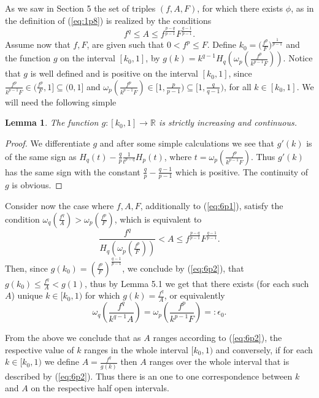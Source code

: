 \documentclass{article}
\numberwithin{equation}{section}
\newtheorem{lemma}{Lemma}[section]
\theoremstyle{definition}
\theoremstyle{remark}
\begin{document}
As we saw in Section 5 the set of triples $(f,A,F)$, for which there exists $\phi$, as in the definition of (\ref{eq:1p8}) is realized by the conditions
\begin{equation}\label{eq:6p1}
f^q\leq A \leq f^{\frac{p-q}{p-1}} F^{\frac{q-1}{p-1}}. 
\end{equation}
Assume now that $f,F$, are given such that $0<f^p\leq F$. Define 
$k_0=\big(\frac{f^p}{F}\big)^{\frac{1}{p-1}}$ and the function $g$ on the interval $[k_0,1]$, by $g(k)=k^{q-1} H_q(\omega_p(\frac{f^p}{k^{p-1}F}))$.
Notice that $g$ is well defined and is positive on the interval $[k_0,1]$, since $\frac{f^p}{k^{p-1}F} \in (\frac{f^p}{F},1] \subseteq (0,1] $
and $\omega_p(\frac{f^p}{k^{p-1}F}) \in [1,\frac{p}{p-1}) \subseteq [1,\frac{q}{q-1})$, for all $k\in [k_0,1]$. We will need the following simple

\begin{lemma} \label{lem:6p1}
The function $g:[k_0,1] \rightarrow \mathbb{R}$ is strictly increasing and continuous.
\end{lemma}

\begin{proof}
We differentiate $g$ and after some simple calculations we see that $g'(k)$ is of the same sign as $H_q(t)-\frac{q}{p}\frac{1}{t^{p-q}}H_p(t)$, where $t=\omega_p(\frac{f^p}{k^{p-1}F})$. Thus $g'(k)$ has the same sign with the constant $\frac{q}{p}-\frac{q-1}{p-1}$ which is positive. The continuity of $g$ is obvious.
\end{proof}
Consider now the case where $f,A,F$, additionally to (\ref{eq:6p1}), satisfy the condition 
$\omega_q(\frac{f^q}{A})> \omega_p(\frac{f^p}{F})$, which is equivalent to
\begin{equation}\label{eq:6p2}
\frac{f^q}{H_q(\omega_p(\frac{f^p}{F}))}< A \leq f^{\frac{p-q}{p-1}} F^{\frac{q-1}{p-1}}. 
\end{equation}
Then, since $g(k_0)=(\frac{f^p}{F})^{\frac{q-1}{p-1}}$, we conclude by (\ref{eq:6p2}), that $g(k_0) \leq \frac{f^q}{A}<g(1)$, thus by Lemma 5.1 we get that there exists (for each such $A$) unique $k\in [k_0,1)$ for which $g(k)=\frac{f^q}{A}$, or equivalently
\begin{equation}\label{eq:6p3}
\omega_q(\frac{f^q}{k^{q-1}A})=\omega_p(\frac{f^p}{k^{p-1}F})=:\epsilon_0 .
\end{equation}

From the above we conclude that as $A$ ranges according to (\ref{eq:6p2}), the respective value of $k$ ranges in the whole interval $[k_0,1)$ and conversely, if for each $k\in [k_0,1)$ we define $A=\frac{f^q}{g(k)}$  then $A$ ranges over the whole interval that is described by (\ref{eq:6p2}). Thus there is an one to one correspondence between $k$ and $A$ on the respective half open intervals.
\end{document}
